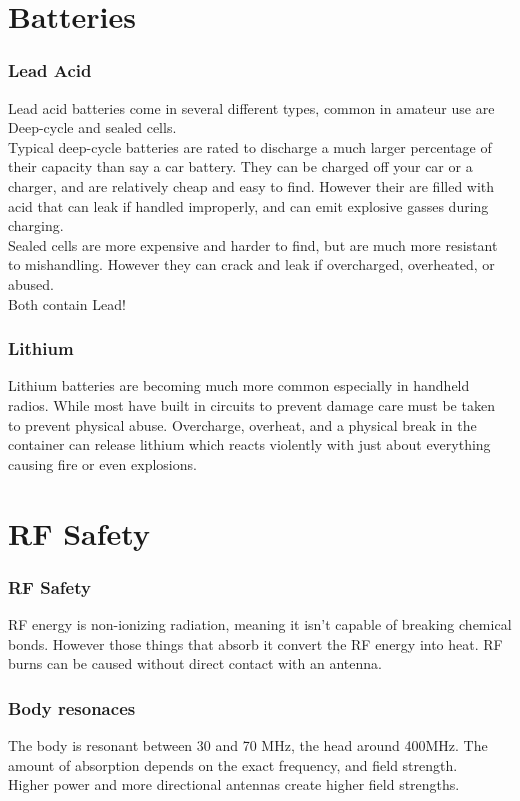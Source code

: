 \documentclass[10pt]{beamer}
\begin{document}
\section{Batteries}
\begin{frame}
\frametitle{Lead Acid}
Lead acid batteries come in several different types, common in amateur use are Deep-cycle and sealed cells.\\
Typical deep-cycle batteries are rated to discharge a much larger percentage of their capacity than say a car battery. They can be charged off your car or a charger, and are relatively cheap and easy to find. However their are filled with acid that can leak if handled improperly, and can emit explosive gasses during charging.\\
Sealed cells are more expensive and harder to find, but are much more resistant to mishandling. However they can crack and leak if overcharged, overheated, or abused.\\
Both contain Lead! 
\end{frame}

\begin{frame}
\frametitle{Lithium}
Lithium batteries are becoming much more common especially in handheld radios. While most have built in circuits to prevent damage care must be taken to prevent physical abuse. Overcharge, overheat, and a physical break in the container can release lithium which reacts violently with just about everything causing fire or even explosions.
\end{frame}

\section{RF Safety}
\begin{frame}
\frametitle{RF Safety}
RF energy is non-ionizing radiation, meaning it isn't capable of breaking chemical bonds. However those things that absorb it convert the RF energy into heat. RF burns can be caused without direct contact with an antenna.
\end{frame}

\begin{frame}
\frametitle{Body resonaces}
The body is resonant between 30 and 70 MHz, the head around 400MHz. The amount of absorption depends on the exact frequency, and field strength.\\
Higher power and more directional antennas create higher field strengths.
\end{frame}
\end{document}
